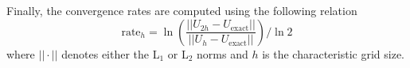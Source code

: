 \documentclass[preprint,10pt]{elsarticle}
\newcommand{\tcr}[1]{\textcolor{red}{#1}}
\newcommand{\tcb}[1]{\textcolor{blue}{#1}}
\begin{document}
Finally, the convergence rates are computed using the following relation 
\begin{equation}
\label{eq:conv_rates}
\text{rate}_h = \ln \left( \frac{|| U_{2h}-U_{\text{exact}} ||}{|| U_{h}-U_{\text{exact}}|| } \right) / \ln 2
\end{equation}
where $|| \cdot ||$ denotes either the L$_1$ or L$_2$ norms and $h$ is the characteristic grid size.

\end{document}
